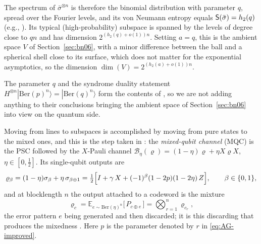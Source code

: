 \documentclass[11pt]{amsart}
\theoremstyle{plain}
\theoremstyle{remark}
\newcommand{\E}{\mathbb{E}}
\newcommand{\ra}{\rangle}
\begin{document}
The spectrum of $\bar\sigma^{\otimes n}$ is therefore the binomial distribution
with parameter $q$, spread over the Fourier levels, and its von Neumann entropy equals ${\sf S}(\bar\sigma)=h_2(q)$ (e.g., \cite[p.253]{Wilde17}). Its typical (high-probability) subspace is spanned by the levels of degree close to $qn$ and has dimension $2^{(h_2(q)+o(1))n}$. Setting $a=q$, this is the ambient space $V$ of Section~\ref{sec:bn06}, with a minor difference between the ball and a spherical shell close to its surface, which does not matter for the exponential asymptotics, 
so the dimension
$\dim(V)=2^{(h_2(a)+o(1))n}$. 

The parameter $q$ and the syndrome duality statement $H^{\otimes n}|\mathrm{Ber}(p)^n\ra=|\mathrm{Ber}(q)^n\ra$  form the contents of \cite[\S1.5, Prop.~5]{AG26}, so we are not adding anything to their conclusions bringing the ambient space of Section~\ref{sec:bn06} into view on the quantum side.

Moving from lines to subspaces is accomplished by moving from pure states to the mixed ones, and 
this is the step taken in \cite[\S5.1]{AG26}: the {\em mixed-qubit
channel} (MQC) is the PSC followed by the $X$-Pauli channel
$\mathcal B_\eta(\varrho)=(1-\eta)\varrho+\eta X\varrho X$, $\eta\in[0,\frac12]$.
Its single-qubit outputs are
\begin{equation}\label{eq: mqc}
 \varrho_\beta=(1-\eta)\sigma_\beta+\eta\,\sigma_{\beta\oplus1}
 =\tfrac12\Bigl[I+\gamma\,X+(-1)^{\beta}(1-2p)(1-2\eta)\,Z\Bigr],
 \qquad \beta\in\{0,1\},
\end{equation}
and at blocklength $n$ the output attached to a codeword is the mixture
\[
 \varrho_c=\E_{e\sim\mathrm{Ber}(\eta)^n}\bigl[\,P_{c\oplus e}\,\bigr]
 =\bigotimes_{r=1}^{n}\varrho_{c_r} ,
\]
the error pattern $e$ being generated and then discarded; it is this discarding
that produces the mixedness \cite[Footnote 9]{AG26}. Here $p$ is the parameter
denoted by $r$ in \eqref{eq:AG-improved}.
\end{document}
